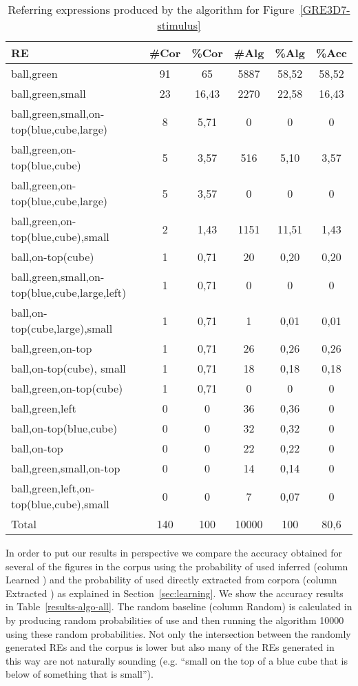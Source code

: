 \begin{table}[h!]
\begin{center}
\begin{tabular}{|l|c|c|c|c|c|}
\hline
RE & \#Cor & \%Cor & \#Alg & \%Alg & \%Acc \\
\hline
ball,green & 91 & 65 & 5887 &58,52 & 58,52 \\
ball,green,small & 23 & 16,43 & 2270 & 22,58 & 16,43 \\
ball,green,small,on-top(blue,cube,large) & 8 & 5,71 & 0 & 0 & 0 \\
ball,green,on-top(blue,cube) & 5 & 3,57 & 516 & 5,10 & 3,57 \\
ball,green,on-top(blue,cube,large) & 5 & 3,57 & 0 & 0 & 0 \\
ball,green,on-top(blue,cube),small & 2 & 1,43 & 1151 & 11,51 & 1,43 \\
ball,on-top(cube) & 1 & 0,71 & 20 & 0,20 & 0,20 \\
ball,green,small,on-top(blue,cube,large,left) & 1 & 0,71 & 0 & 0 & 0 \\
ball,on-top(cube,large),small	& 1 & 0,71 & 1 & 0,01 & 0,01 \\
ball,green,on-top & 1 & 0,71 &	26 & 0,26 & 0,26 \\
ball,on-top(cube), small & 1 & 0,71 & 18 & 0,18 & 0,18 \\
ball,green,on-top(cube) & 1 & 0,71 & 0 & 0 & 0 \\
ball,green,left	& 0 & 0 & 36 & 0,36 & 0 \\
ball,on-top(blue,cube) & 0 & 0 & 32 & 0,32 & 0 \\
ball,on-top & 0 & 0 & 22 & 0,22 & 0 \\
ball,green,small,on-top & 0 & 0 & 14 & 0,14 & 0 \\
ball,green,left,on-top(blue,cube),small & 0 &  0 & 7 & 0,07 & 0 \\
\hline
Total & 140 & 100 & 10000 & 100 & 80,6 \\
\hline
\end{tabular}
\caption{Referring expressions produced by the algorithm for Figure~\ref{GRE3D7-stimulus}\label{results-algo-fig3}}
\end{center}
\end{table}

In order to put our results in perspective we compare the accuracy obtained for several of the figures in the corpus using the probability of used inferred (column Learned \puse) and the probability of used directly extracted from corpora (column Extracted \puse) as explained in Section~\ref{sec:learning}. We show the accuracy results in Table~\ref{results-algo-all}. The random baseline (column Random) is calculated in by producing random probabilities of use and then running the algorithm 10000 using these random probabilities. Not only the intersection between the randomly generated REs and the corpus is lower but also many of  the REs generated in this way are not naturally sounding (e.g. ``small on the top of a blue cube that is below of something that is small''). 

